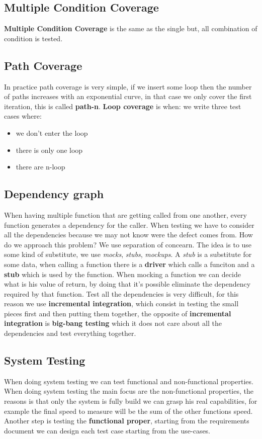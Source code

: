 \documentclass[12pt]{article}
\begin{document}
\subsection{Multiple Condition Coverage}
\textbf{Multiple Condition Coverage} is the same as the single but, all combination of condition is tested.

\subsection{Path Coverage}
In practice path coverage is very simple, if we insert some loop then the number of paths increases with an exponential curve, in that case we only cover the first iteration, this is called \textbf{path-n}. \textbf{Loop coverage} is when: we write three test cases where:
\begin{itemize}
  \item we don't enter the loop
  \item there is only one loop
  \item there are n-loop
\end{itemize}

\subsection{Dependency graph}
When having multiple function that are getting called from one another, every function generates a dependency for the caller. When testing we have to consider all the dependencies because we may not know were the defect comes from. How do we approach this problem? We use separation of concearn. The idea is to use some kind of substitute, we use \emph{mocks}, \emph{stubs}, \emph{mockups}. A \emph{stub} is a substitute for some data, when calling a function there is a \textbf{driver} which calls a funciton and a \textbf{stub} which is used by the function. When mocking a function we can decide what is his value of return, by doing that it's possible eliminate the dependency required by that function. Test all the dependencies is very difficult, for this reason we use \textbf{incremental integration}, which consist in testing the small pieces first and then putting them together, the opposite of \textbf{incremental integration} is \textbf{big-bang testing} which it does not care about all the dependencies and test everything together.

\subsection{System Testing}
When doing system testing we can test functional and non-functional properties. When doing system testing the main focus are the non-functional properties, the reasons is that only the system is fully build we can grasp his real capabilities, for example the final speed to measure will be the sum of the other functions speed. Another step is testing the \textbf{functional proper}, starting from the requirements document we can design each test case starting from the use-cases.
\end{document}

